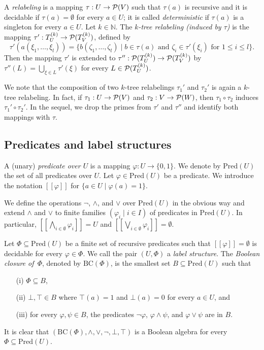 \documentclass[10pt]{scrartcl}
\newcommand{\nat}{\mathbb{N}}
\newcommand{\seml}{[\![}
\newcommand{\semr}{]\!]}
\newcommand{\Pred}{\mathrm{Pred}}
\newcommand{\BC}{\mathrm{BC}}
\begin{document}
A \emph{relabeling} is a mapping $\tau: U \rightarrow {\cal P}(V)$
such that $\tau(a)$ is recursive and it is decidable if $\tau(a)=\emptyset$ for every $a \in U$; it
is called \emph{deterministic} if $\tau(a)$ is a singleton for every
$a \in U$. Let $k \in \nat$. The \emph{$k$-tree relabeling (induced by
  $\tau$)} is the mapping $\tau': T_U^{(k)} \rightarrow {\cal
  P}(T_{V}^{(k)})$, defined by $$\tau'(a(\xi_1,\ldots,\xi_l))=\{b(\zeta_1,\ldots,\zeta_l)\mid b\in \tau(a) \text{ and } \zeta_i\in \tau'(\xi_i) \text{ for } 1\le i\le l \}.$$
Then the mapping $\tau'$ is extended to $\tau'': {\cal P}(T_U^{(k)}) \rightarrow {\cal P}(T_{V}^{(k)})$
by $\tau''(L) = \bigcup_{\xi\in L} \tau'(\xi)$ for every $L \in {\cal
  P}(T_U^{(k)})$. 

We note that the composition of two $k$-tree relabelings $\tau_1'$ and
$\tau_2'$  is again a $k$-tree relabeling. In fact, if $\tau_1: U \rightarrow {\cal P}(V)$
and $\tau_2:  V \rightarrow {\cal P}(W)$, then $\tau_1 \circ \tau_2$
induces $\tau_1' \circ \tau_2'$. 
In the sequel, we drop the primes from $\tau'$ and $\tau''$ and
identify both mappings with $\tau$. 

\subsection{Predicates and label structures}

 A (unary) \emph{predicate
  over $U$} is a mapping $\varphi: U \rightarrow \{0,1\}$. We denote
by $\Pred(U)$ the set of all predicates over $U$. 
Let $\varphi \in \Pred(U)$ be a predicate. We introduce the notation $\seml
\varphi \semr$ for $\{a \in U \mid \varphi(a) =1\}$. 


We define the operations
$\neg$, $\wedge$, and $\vee$ over $\Pred(U)$ in the obvious way and extend $\wedge$ and $\vee$
to finite families $(\varphi_i \mid i\in I)$ of predicates in $\Pred(U)$.  In particular,
$\seml \bigwedge_{i\in \emptyset} \varphi_i\semr = U$ and $\seml \bigvee_{i\in \emptyset} \varphi_i\semr = \emptyset$.

Let $\Phi \subseteq \Pred(U)$ be a finite set of  recursive predicates such that
$\seml\varphi \semr=\emptyset$ is decidable for every $\varphi \in \Phi$.
We call the pair $(U,\Phi)$ a \emph{label structure}.
 The \emph{Boolean closure of~$\Phi$}, denoted
by $\BC(\Phi)$, is the smallest set $B \subseteq  \Pred(U)$ such that 
\begin{enumerate}
\item[(i)] $\Phi \subseteq B$,
\item[(ii)] $\bot, \top \in B$ where $\top(a) = 1$ and $\bot(a) = 0$ for
  every $a \in U$,  and
\item[(iii)] for every $\varphi, \psi \in B$, the predicates $\neg \varphi$,
  $\varphi \wedge \psi$, and $\varphi \vee \psi$ are in $B$.
\end{enumerate}
It is clear that
$(\BC(\Phi),\wedge,\vee,\neg,\bot,\top)$ is a Boolean algebra for every $\Phi \subseteq \Pred(U)$.
 
\end{document}
